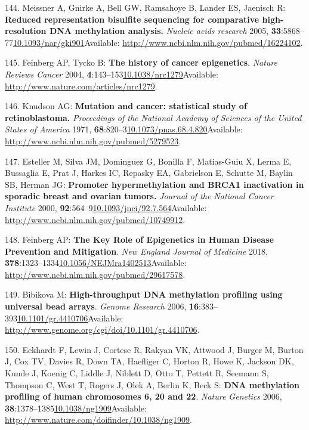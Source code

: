 \documentclass[
]{book}
\begin{document}
\leavevmode\hypertarget{ref-Meissner2005}{}%
144. Meissner A, Gnirke A, Bell GW, Ramsahoye B, Lander ES, Jaenisch R: \textbf{Reduced representation bisulfite sequencing for comparative high-resolution DNA methylation analysis.} \emph{Nucleic acids research} 2005, \textbf{33}:5868--77\href{https://doi.org/10.1093/nar/gki901}{10.1093/nar/gki901}Available: \url{http://www.ncbi.nlm.nih.gov/pubmed/16224102}.

\leavevmode\hypertarget{ref-Feinberg2004}{}%
145. Feinberg AP, Tycko B: \textbf{The history of cancer epigenetics}. \emph{Nature Reviews Cancer} 2004, \textbf{4}:143--153\href{https://doi.org/10.1038/nrc1279}{10.1038/nrc1279}Available: \url{http://www.nature.com/articles/nrc1279}.

\leavevmode\hypertarget{ref-Knudson1971}{}%
146. Knudson AG: \textbf{Mutation and cancer: statistical study of retinoblastoma.} \emph{Proceedings of the National Academy of Sciences of the United States of America} 1971, \textbf{68}:820--3\href{https://doi.org/10.1073/pnas.68.4.820}{10.1073/pnas.68.4.820}Available: \url{http://www.ncbi.nlm.nih.gov/pubmed/5279523}.

\leavevmode\hypertarget{ref-Esteller2000}{}%
147. Esteller M, Silva JM, Dominguez G, Bonilla F, Matias-Guiu X, Lerma E, Bussaglia E, Prat J, Harkes IC, Repasky EA, Gabrielson E, Schutte M, Baylin SB, Herman JG: \textbf{Promoter hypermethylation and BRCA1 inactivation in sporadic breast and ovarian tumors.} \emph{Journal of the National Cancer Institute} 2000, \textbf{92}:564--9\href{https://doi.org/10.1093/jnci/92.7.564}{10.1093/jnci/92.7.564}Available: \url{http://www.ncbi.nlm.nih.gov/pubmed/10749912}.

\leavevmode\hypertarget{ref-Feinberg2018}{}%
148. Feinberg AP: \textbf{The Key Role of Epigenetics in Human Disease Prevention and Mitigation}. \emph{New England Journal of Medicine} 2018, \textbf{378}:1323--1334\href{https://doi.org/10.1056/NEJMra1402513}{10.1056/NEJMra1402513}Available: \url{http://www.ncbi.nlm.nih.gov/pubmed/29617578}.

\leavevmode\hypertarget{ref-Bibikova2006}{}%
149. Bibikova M: \textbf{High-throughput DNA methylation profiling using universal bead arrays}. \emph{Genome Research} 2006, \textbf{16}:383--393\href{https://doi.org/10.1101/gr.4410706}{10.1101/gr.4410706}Available: \url{http://www.genome.org/cgi/doi/10.1101/gr.4410706}.

\leavevmode\hypertarget{ref-Eckhardt2006}{}%
150. Eckhardt F, Lewin J, Cortese R, Rakyan VK, Attwood J, Burger M, Burton J, Cox TV, Davies R, Down TA, Haefliger C, Horton R, Howe K, Jackson DK, Kunde J, Koenig C, Liddle J, Niblett D, Otto T, Pettett R, Seemann S, Thompson C, West T, Rogers J, Olek A, Berlin K, Beck S: \textbf{DNA methylation profiling of human chromosomes 6, 20 and 22}. \emph{Nature Genetics} 2006, \textbf{38}:1378--1385\href{https://doi.org/10.1038/ng1909}{10.1038/ng1909}Available: \url{http://www.nature.com/doifinder/10.1038/ng1909}.
\end{document}

